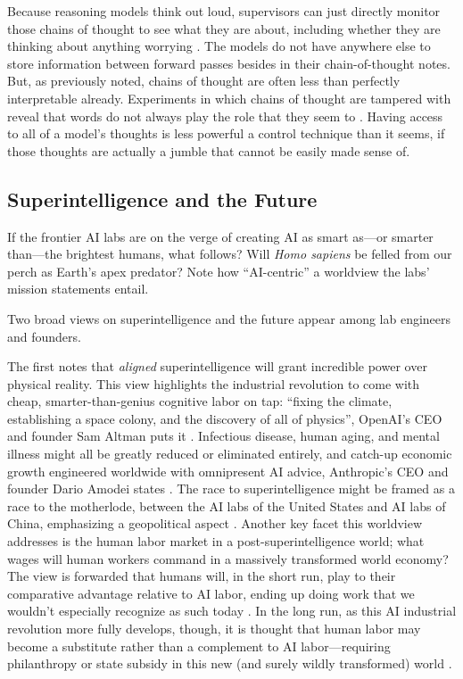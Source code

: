 Because reasoning models think out loud, supervisors can just directly monitor
those chains of thought to see what they are about, including whether they are
thinking about anything worrying \cite{baker2025monitoring}. The models do not
have anywhere else to store information between forward passes besides in their
chain-of-thought notes. But, as previously noted, chains of thought are often
less than perfectly interpretable already. Experiments in which chains of
thought are tampered with reveal that words do not always play the role that
they seem to \cite{turpin2023unfaithful,chen2025unfaithful}. Having access to
all of a model's thoughts is less powerful a control technique than it seems,
if those thoughts are actually a jumble that cannot be easily made sense of.

\subsection{Superintelligence and the Future}
If the frontier AI labs are on the verge of creating AI as smart as---or
smarter than---the brightest humans, what follows? Will \emph{Homo sapiens} be
felled from our perch as Earth's apex predator? Note how ``AI-centric'' a
worldview the labs' mission statements entail.

Two broad views on superintelligence and the future appear among lab engineers
and founders.

The first notes that \emph{aligned} superintelligence will grant incredible
power over physical reality. This view highlights the industrial revolution to
come with cheap, smarter-than-genius cognitive labor on tap: ``fixing the
climate, establishing a space colony, and the discovery of all of physics'',
OpenAI's CEO and founder Sam Altman puts it \cite{altman2024intelligence}.
Infectious disease, human aging, and mental illness might all be greatly
reduced or eliminated entirely, and catch-up economic growth engineered
worldwide with omnipresent AI advice, Anthropic's CEO and founder Dario Amodei
states \cite{amodei2024grace}. The race to superintelligence might be framed as
a race to the motherlode, between the AI labs of the United States and AI labs
of China, emphasizing a geopolitical aspect
\cite{aschenbrenner2024situational,amodei2024grace}. Another key facet this
worldview addresses is the human labor market in a post-superintelligence
world; what wages will human workers command in a massively transformed world
economy? The view is forwarded that humans will, in the short run, play to
their comparative advantage relative to AI labor, ending up doing work that we
wouldn't especially recognize as such today
\cite{altman2024intelligence,amodei2024grace}. In the long run, as this AI
industrial revolution more fully develops, though, it is thought that human
labor may become a substitute rather than a complement to AI labor---requiring
philanthropy or state subsidy in this new (and surely wildly transformed) world
\cite{amodei2024grace}.


